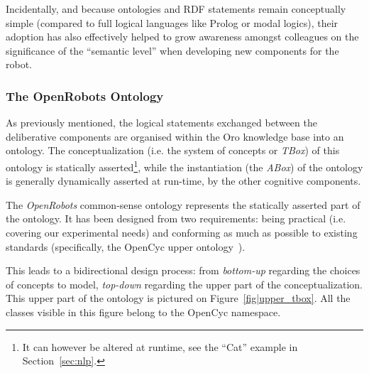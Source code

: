 \documentclass[preprint,3p,times]{elsarticle}
\newcommand{\ie}{i.e.\xspace}
\begin{document}
Incidentally, and because ontologies and RDF statements remain conceptually
simple (compared to full logical languages like {\sc Prolog} or modal logics),
their adoption has also effectively helped to grow awareness amongst colleagues
on the significance of the ``semantic level'' when developing new components
for the robot.

\subsubsection{The OpenRobots Ontology}

As previously mentioned, the logical statements exchanged between the deliberative
components are organised within the {\sc Oro} knowledge base into an ontology.
The conceptualization (\ie the system of concepts or \emph{TBox}) of this
ontology is statically asserted\footnote{It can however be altered at runtime,
see the ``Cat'' example in Section~\ref{sec:nlp}.}, while the instantiation (the
\emph{ABox}) of the ontology is generally dynamically asserted at run-time, by
the other cognitive components.

The \emph{OpenRobots} common-sense ontology represents the statically asserted
part of the ontology. It has been designed from two requirements: being
practical (\ie covering our experimental needs) and conforming as much as
possible to existing standards (specifically, the {\sc OpenCyc} upper
ontology~\cite{lenat1990cyc}).

This leads to a bidirectional design process: from \emph{bottom-up} regarding
the choices of concepts to model, \emph{top-down} regarding the upper part of
the conceptualization. This upper part of the ontology is pictured on
Figure~\ref{fig|upper_tbox}. All the classes visible in this figure belong to
the {\sc OpenCyc} namespace.
\end{document}
